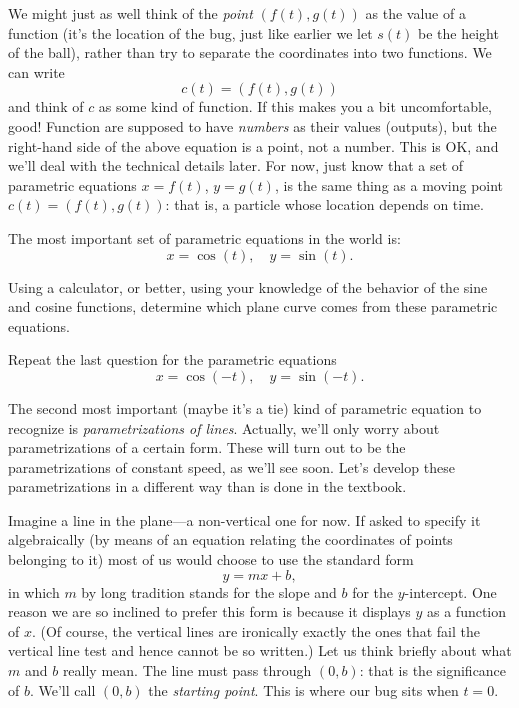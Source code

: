 \documentclass[11pt]{amsart}
\begin{document}
We might just as well think of the \emph{point} $(f(t), g(t))$ as the value of a function (it's the location of the bug, just like earlier we let $s(t)$ be the height of the ball), rather than try to separate the coordinates into two functions. We can write
\[
	c(t) = (f(t), g(t))
\]
and think of $c$ as some kind of function. If this makes you a bit uncomfortable, good! Function are supposed to have \emph{numbers} as their values (outputs), but the right-hand side of the above equation is a point, not a number. This is OK, and we'll deal with the technical details later. For now, just know that a set of parametric equations $x = f(t)$, $y = g(t)$, is the same thing as a moving point $c(t) = (f(t),g(t))$: that is, a particle whose location depends on time.

The most important set of parametric equations in the world is:
\[
	x = \cos(t), \quad y = \sin(t).
\]
\begin{discussionquestion}
	Using a calculator, or better, using your knowledge of the behavior of the sine and cosine functions, determine which plane curve comes from these parametric equations.
\end{discussionquestion}
\begin{discussionquestion}
	Repeat the last question for the parametric equations
	\[
		x = \cos(-t), \quad y = \sin(-t).
	\]
\end{discussionquestion}

The second most important (maybe it's a tie) kind of parametric equation to recognize is \emph{parametrizations of lines}. Actually, we'll only worry about parametrizations of a certain form. These will turn out to be the parametrizations of constant speed, as we'll see soon. Let's develop these parametrizations in a different way than is done in the textbook.

Imagine a line in the plane---a non-vertical one for now. If asked to specify it algebraically (by means of an equation relating the coordinates of points belonging to it) most of us would choose to use the standard form
\[
	y = mx + b,
\]
in which $m$ by long tradition stands for the slope and $b$ for the $y$-intercept. One reason we are so inclined to prefer this form is because it displays $y$ as a function of $x$. (Of course, the vertical lines are ironically exactly the ones that fail the vertical line test and hence cannot be so written.) Let us think briefly about what $m$ and $b$ really mean. The line must pass through $(0,b)$: that is the significance of $b$. We'll call $(0,b)$ the \emph{starting point}. This is where our bug sits when $t = 0$. 
\end{document}
